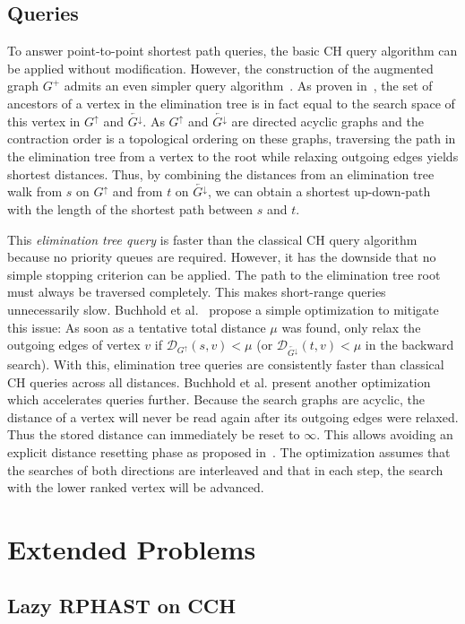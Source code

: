 \documentclass[a4paper, english, cleveref]{lipics-v2021}
\newcommand*{\dist}{\mathcal{D}}
\newcommand*{\gchu}{G^{\uparrow}}
\newcommand*{\rgchd}{\overleftarrow{G^{\downarrow}}}
\begin{document}
\subsection{Queries}

To answer point-to-point shortest path queries, the basic CH query algorithm can be applied without modification.
However, the construction of the augmented graph $G^+$ admits an even simpler query algorithm~\cite{DibbeltSW16}.
As proven in~\cite{BauerCRW16}, the set of ancestors of a vertex in the elimination tree is in fact equal to the search space of this vertex in $\gchu$ and $\rgchd$. %
As $\gchu$ and $\rgchd$ are directed acyclic graphs and the contraction order is a topological ordering on these graphs, traversing the path in the elimination tree from a vertex to the root while relaxing outgoing edges yields shortest distances.
Thus, by combining the distances from an elimination tree walk from $s$ on $\gchu$ and from $t$ on $\rgchd$, we can obtain a shortest up-down-path with the length of the shortest path between $s$ and $t$.

This \emph{elimination tree query} is faster than the classical CH query algorithm because no priority queues are required.
However, it has the downside that no simple stopping criterion can be applied.
The path to the elimination tree root must always be traversed completely.
This makes short-range queries unnecessarily slow.
Buchhold et al.~\cite{BuchholdSW19} propose a simple optimization to mitigate this issue:
As soon as a tentative total distance $\mu$ was found, only relax the outgoing edges of vertex $v$ if $\dist_{\gchu}(s,v) < \mu$ (or $\dist_{\rgchd}(t,v) < \mu$ in the backward search).
With this, elimination tree queries are consistently faster than classical CH queries across all distances.
Buchhold et al. present another optimization which accelerates queries further.
Because the search graphs are acyclic, the distance of a vertex will never be read again after its outgoing edges were relaxed.
Thus the stored distance can immediately be reset to $\infty$.
This allows avoiding an explicit distance resetting phase as proposed in~\cite{DibbeltSW16}.
The optimization assumes that the searches of both directions are interleaved and that in each step, the search with the lower ranked vertex will be advanced.

\section{Extended Problems}
\subsection{Lazy RPHAST on CCH}
\end{document}
